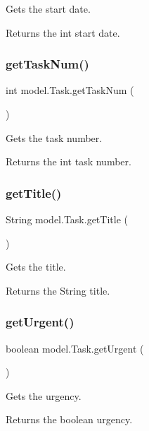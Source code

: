 Gets the start date. \begin{DoxyReturn}{Returns}
the int start date. 
\end{DoxyReturn}
\mbox{\label{classmodel_1_1_task_adf5ceec1aefd6a042218605707c8f61a}} 
\subsubsection{get\+Task\+Num()}
{\footnotesize\ttfamily int model.\+Task.\+get\+Task\+Num (\begin{DoxyParamCaption}{ }\end{DoxyParamCaption})}

Gets the task number. \begin{DoxyReturn}{Returns}
the int task number. 
\end{DoxyReturn}
\mbox{\label{classmodel_1_1_task_a3016babcf59132145ef35906075ea109}} 
\subsubsection{get\+Title()}
{\footnotesize\ttfamily String model.\+Task.\+get\+Title (\begin{DoxyParamCaption}{ }\end{DoxyParamCaption})}

Gets the title. \begin{DoxyReturn}{Returns}
the String title. 
\end{DoxyReturn}
\mbox{\label{classmodel_1_1_task_a1eabd41ad4d1743e219eba8d204642cf}} 
\subsubsection{get\+Urgent()}
{\footnotesize\ttfamily boolean model.\+Task.\+get\+Urgent (\begin{DoxyParamCaption}{ }\end{DoxyParamCaption})}

Gets the urgency. \begin{DoxyReturn}{Returns}
the boolean urgency. 
\end{DoxyReturn}
\mbox{\label{classmodel_1_1_task_acdc44948b068cd0d2f335310c5d700be}} 

